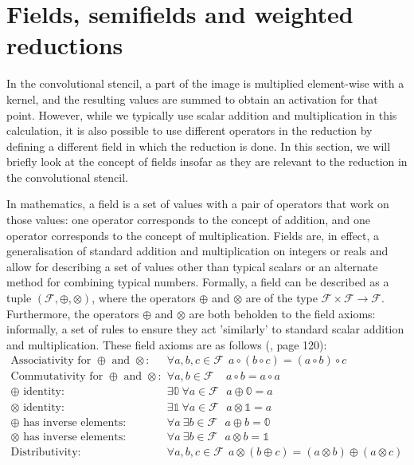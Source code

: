 \documentclass[a4paper, 12pt]{report}
\begin{document}
\section{Fields, semifields and weighted reductions}
In the convolutional stencil, a part of the image is multiplied element-wise with a kernel, and the resulting values are summed to obtain an activation for that point. However, while we typically use scalar addition and multiplication in this calculation, it is also possible to use different operators in the reduction by defining a different field in which the reduction is done. In this section, we will briefly look at the concept of fields insofar as they are relevant to the reduction in the convolutional stencil.

In mathematics, a field is a set of values with a pair of operators that work on those values: one operator corresponds to the concept of addition, and one operator corresponds to the concept of multiplication. Fields are, in effect, a generalisation of standard addition and multiplication on integers or reals and allow for describing a set of values other than typical scalars or an alternate method for combining typical numbers. Formally, a field can be described as a tuple $(\mathcal{F}, \oplus, \otimes)$, where the operators $\oplus$ and $\otimes$ are of the type $\mathcal{F}\times\mathcal{F}\rightarrow\mathcal{F}$. Furthermore, the operators $\oplus$ and $\otimes$ are both beholden to the field axioms: informally, a set of rules to ensure they act 'similarly' to standard scalar addition and multiplication. These field axioms are as follows (\cite{beachy2006abstract}, page 120):
\begin{align}
\textrm{Associativity for $\oplus$ and $\otimes$: }&\forall a,b,c\in \mathcal{F}~~  a \circ (b \circ c) = (a\circ b) \circ c \\ 
\textrm{Commutativity for $\oplus$ and $\otimes$: }&\forall a,b\in \mathcal{F}~~~~~ a\circ b = a  \circ a \\
\oplus\textrm{ identity: }& \exists \mathbb{0}~\forall a\in \mathcal{F}~~~ a\oplus \mathbb{0} = a \\ 
\otimes\textrm{ identity: }& \exists \mathbb{1}~\forall a\in \mathcal{F}~~~ a\otimes \mathbb{1} = a \\ 
\oplus\textrm{ has inverse elements: }& \forall a~\exists b\in \mathcal{F}~~~ a\oplus b = \mathbb{0}  \\ 
\otimes\textrm{ has inverse elements: }& \forall a~\exists b\in \mathcal{F}~~~ a\otimes b = \mathbb{1}  \\ 
\textrm{Distributivity: }&\forall a,b,c\in \mathcal{F}~~ a\otimes (b \oplus c) = (a\otimes b)\oplus(a\otimes c)
\end{align}
\end{document}
